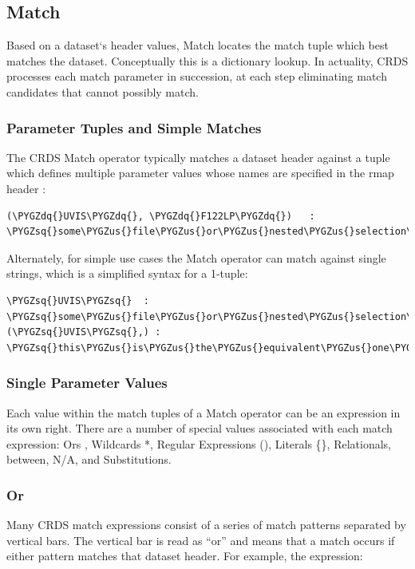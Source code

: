 \documentclass[letterpaper,10pt,english]{sphinxmanual}
\def\PYGZus{\char`\_}
\def\PYGZsq{\char`\'}
\def\PYGZdq{\char`\"}
\begin{document}
\subsection{Match}
\label{rmap_syntax:match}
Based on a dataset{}`s header values,  Match locates the match tuple which best matches the dataset.   Conceptually this
is a dictionary lookup.   In actuality, CRDS processes each match parameter in succession,  at each step eliminating
match candidates that cannot possibly match.


\subsubsection{Parameter Tuples and Simple Matches}
\label{rmap_syntax:parameter-tuples-and-simple-matches}
The CRDS Match operator typically matches a dataset header against a tuple which defines multiple parameter values whose
names are specified in the rmap header :

\begin{Verbatim}[commandchars=\\\{\}]
(\PYGZdq{}UVIS\PYGZdq{}, \PYGZdq{}F122LP\PYGZdq{})   :  \PYGZsq{}some\PYGZus{}file\PYGZus{}or\PYGZus{}nested\PYGZus{}selection\PYGZsq{}
\end{Verbatim}

Alternately,  for simple use cases the Match operator can match against single
strings,  which is a simplified syntax for a 1-tuple:

\begin{Verbatim}[commandchars=\\\{\}]
\PYGZsq{}UVIS\PYGZsq{}  :  \PYGZsq{}some\PYGZus{}file\PYGZus{}or\PYGZus{}nested\PYGZus{}selection\PYGZsq{}
(\PYGZsq{}UVIS\PYGZsq{},) : \PYGZsq{}this\PYGZus{}is\PYGZus{}the\PYGZus{}equivalent\PYGZus{}one\PYGZus{}tuple\PYGZsq{}
\end{Verbatim}


\subsubsection{Single Parameter Values}
\label{rmap_syntax:single-parameter-values}
Each value within the match tuples of a Match operator can be an expression in its own right.   There are a number of
special values associated with each match expression:  Ors \textbar{}, Wildcards *,  Regular Expressions (), Literals \{\},
Relationals, between, N/A, and Substitutions.


\subsubsection{Or \textbar{}}
\label{rmap_syntax:or}
Many CRDS match expressions consist of a series of match patterns separated by vertical bars.   The vertical bar is read
as ``or'' and means that a match occurs if either pattern matches that dataset header.   For example, the expression:
\end{document}
